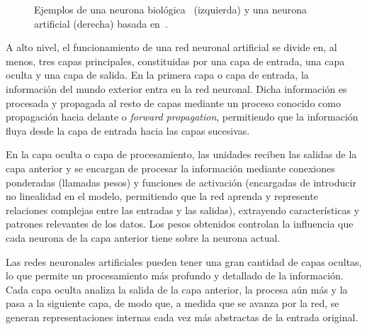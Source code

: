 \begin{figure}[h]
    \centering
    \hfill
    \caption[Ejemplos de neurona biológica~\cite{Neves2018} y neurona artificial (basada en~\cite{Li2024}).]{Ejemplos de una neurona biológica~\cite{Neves2018} (izquierda) y una neurona artificial (derecha) basada en~\cite{Li2024}.}\label{fig:neuronasbioyartificial}
\end{figure}

A alto nivel, el funcionamiento de una red neuronal artificial se divide en, al menos, tres capas principales, constituidas por una capa de entrada, una capa oculta y una capa de salida. En la primera capa o capa de entrada, la información del mundo exterior entra en la red neuronal. Dicha información es procesada y propagada al resto de capas mediante un proceso conocido como propagación hacia delante o \emph{forward propagation}, permitiendo que la información fluya desde la capa de entrada hacia las capas sucesivas.\newline

En la capa oculta o capa de procesamiento, las unidades reciben las salidas de la capa anterior y se encargan de procesar la información mediante conexiones ponderadas (llamadas pesos) y funciones de activación (encargadas de introducir no linealidad en el modelo, permitiendo que la red aprenda y represente relaciones complejas entre las entradas y las salidas), extrayendo características y patrones relevantes de los datos. Los pesos obtenidos controlan la influencia que cada neurona de la capa anterior tiene sobre la neurona actual.\newline

Las redes neuronales artificiales pueden tener una gran cantidad de capas ocultas, lo que permite un procesamiento más profundo y detallado de la información. Cada capa oculta analiza la salida de la capa anterior, la procesa aún más y la pasa a la siguiente capa, de modo que, a medida que se avanza por la red, se generan representaciones internas cada vez más abstractas de la entrada original.\newline

